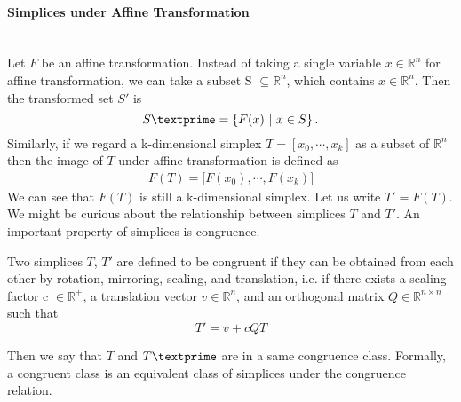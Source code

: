     \paragraph{Simplices under Affine Transformation}\mbox{}\\
    Let $F$ be an affine transformation. 
    Instead of taking a single variable $x\in\mathbb{R}^n$ for affine transformation, we can take a subset S $\subseteq\mathbb{R}^n$, which contains $x\in\mathbb{R}^n$. Then the transformed set $S'$ is
    \begin{equation*}
    S\textprime= \left\{{F}(x) ~|~ x\in S \right\}.
    \end{equation*}
    Similarly, if we regard a k-dimensional simplex ${T} = [{x_0, \cdots, x_k}]$ as a subset of $\mathbb{R}^n$ then the image of ${T}$ under affine transformation is defined as
    \begin{equation*}
    \begin{split}
    {F}({T}) = \big[{F}(x_0), \cdots , {F}(x_k)\big]
    \end{split}
    \end{equation*}
    We can see that $F(T)$ is still a k-dimensional simplex. Let us write $T' = F(T)$. We might be curious about the relationship between simplices $T$ and $T'$. 
    An important property of simplices is congruence.

    \begin{definition*}
    Two simplices $T$, $T'$ are defined to be congruent if they can be obtained from each other by rotation, mirroring, scaling, and translation, i.e. if there exists a scaling factor c $\in\mathbb{R}^{+}$, a translation vector $v\in\mathbb{R}^n$, and an orthogonal matrix $Q\in\mathbb{R}^{n\times n}$ such that
    \begin{equation*}
    T' = v + cQT
    \end{equation*}
    \end{definition*}
    \noindent
    Then we say that ${T}$ and ${T}\textprime$ are in a same congruence class. Formally, a congruent class is an equivalent class of simplices under the congruence relation.
    